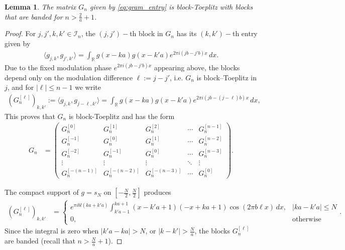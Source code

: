 \documentclass{article}
\newtheorem{lemma}[theorem]{Lemma}
\begin{document}
\begin{lemma} \label{lem: diag_blocks}
The matrix ${G}_n$ given by \eqref{eq:gram_entry} is block-Toeplitz with blocks that are banded for $n>\frac{2}{a}+1$. 
\end{lemma}



\begin{proof}

For $j, j', k, k'\in \mathcal{I}_n$, the $(j,j')-$th block in $G_n$
has its $(k,k')-$th entry given by
\begin{align}
\langle g_{j,k}, g_{j',k'} \rangle = \int_{\mathbb{R}} g(x - {ka}) g(x - {k'a}) e^{2\pi i ({jb} - {j'b})x} \, dx.
\end{align}
Due to the fixed modulation phase $e^{2 \pi i ({jb} - {j'b})x}$ appearing above, the blocks depend only on the modulation difference $\ell:=j-j'$, i.e. $G_n$ is
block–Toeplitz in $j$, and for $|\ell|\le n-1$ we write
    \begin{align*}
     (G_n^{[\ell]})_{k,k'}:=\langle g_{j,k}, g_{j-\ell,k'} \rangle = \int_{\mathbb{R}} g(x - {ka}) g(x - {k'a}) e^{2\pi i ({jb} - {(j-\ell)b})x} \, dx, 
    \end{align*}
This proves that $G_n$ is block-Toeplitz and has the form
\begin{align*}
        G_n &=
\begin{pmatrix}
G_n^{[0]} & G_n^{[1]} & G_n^{[2]} & \cdots & G_n^{[n-1]} \\
G_n^{[-1]} & G_n^{[0]} & G_n^{[1]} & \cdots & G_n^{[n-2]} \\
G_n^{[-2]} & G_n^{[-1]} & G_n^{[0]} & \cdots & G_n^{[n-3]} \\
\vdots & \vdots & \vdots & \ddots & \vdots \\
G_n^{[-(n-1)]} & G_n^{[-(n-2)]} & G_n^{[-(n-3)]} & \cdots & G_n^{[0]}
\end{pmatrix}.
\end{align*}
    
The compact support of $g=s_N$ on $[-\frac{N}{2},\frac{N}{2}]$ produces
\begin{align*}
    (G_n^{[\ell]})_{k,k'}&=
    \begin{cases}
e^{\pi i b l ({ka} + {k'a})}
\displaystyle\int_{{k'a} - 1}^{{ka} + 1} (x - {k'a} + 1)(-x + {ka} + 1) \cos(2\pi b\ell x) \, dx, & |{ka} - {k'a}| \leq N \\[2ex]
0, & \text{otherwise}
\end{cases}.
\end{align*}
Since the integral is zero when $|{k'a}-{ka}| > N$, or $|k-k'|>\frac{N}{a}$, the blocks ${G}_n^{[\ell]}$ are banded (recall that $n > \frac{N}{a}+1$).









\end{proof}
\end{document}

